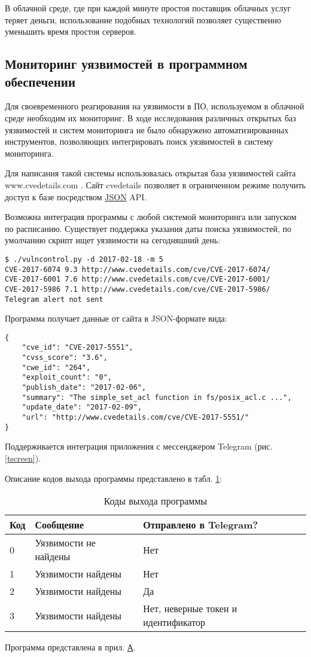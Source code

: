 В облачной среде, где при каждой минуте простоя поставщик облачных услуг теряет деньги, использование подобных технологий позволяет существенно уменьшить время простоя серверов.

\subsection{Мониторинг уязвимостей в программном обеспечении}

Для своевременного реагирования на уязвимости в ПО, используемом в облачной среде необходим их мониторинг.
В ходе исследования различных открытых баз уязвимостей и систем мониторинга не было обнаружено автоматизированных инструментов, позволяющих интегрировать поиск уязвимостей в систему мониторинга.

Для написания такой системы использовалась открытая база уязвимостей сайта www.cvedetails.com \cite{cvedetails}.
Сайт cvedetails позволяет в ограниченном режиме получить доступ к базе посредством \hyperlink{json}{JSON} API.

Возможна интеграция программы с любой системой мониторинга или запуском по расписанию.
Существует поддержка указания даты поиска уязвимостей, по умолчанию скрипт ищет уязвимости на сегодняшний день:
\begin{lstlisting}
$ ./vulncontrol.py -d 2017-02-18 -m 5
CVE-2017-6074 9.3 http://www.cvedetails.com/cve/CVE-2017-6074/
CVE-2017-6001 7.6 http://www.cvedetails.com/cve/CVE-2017-6001/
CVE-2017-5986 7.1 http://www.cvedetails.com/cve/CVE-2017-5986/
Telegram alert not sent
\end{lstlisting}

Программа получает данные от сайта в JSON-формате вида:
\begin{lstlisting}
{
    "cve_id": "CVE-2017-5551",
    "cvss_score": "3.6",
    "cwe_id": "264",
    "exploit_count": "0",
    "publish_date": "2017-02-06",
    "summary": "The simple_set_acl function in fs/posix_acl.c ...",
    "update_date": "2017-02-09",
    "url": "http://www.cvedetails.com/cve/CVE-2017-5551/"
}
\end{lstlisting}


Поддерживается интеграция приложения с мессенджером Telegram (рис. \ref{tscreen}).


Описание кодов выхода программы представлено в табл. \ref{exitcodes}:
\begin{table}[H]
  \caption{Коды выхода программы}\label{exitcodes}
  \begin{tabular}{|l|l|l|}
  \hline Код & Сообщение & Отправлено в Telegram? \\
  \hline 0 & Уязвимости не найдены & Нет \\
  \hline 1 & Уязвимости найдены & Нет \\
  \hline 2 & Уязвимости найдены & Да \\
  \hline 3 & Уязвимости найдены & Нет, неверные токен и идентификатор \\
  \hline
  \end{tabular}
\end{table}

Программа представлена в прил. \hyperlink{app-a}{А}.

\clearpage

